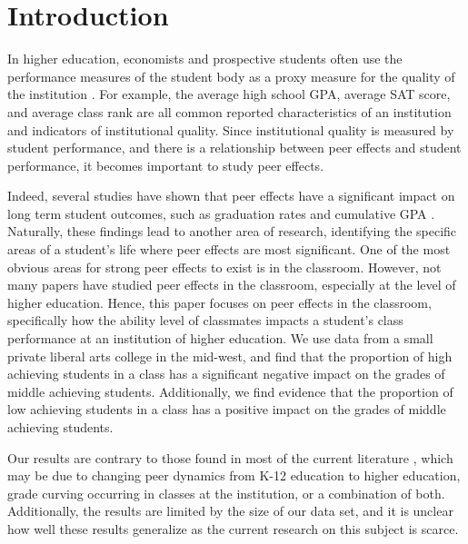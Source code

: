 \documentclass[12pt,letterpaper,english,fleqn]{article}
\date{March 2016}
\begin{document}

\doublespacing





\section{Introduction}\label{intro}

In higher education, economists and prospective students often use the performance measures of the student body as a proxy measure for the quality of the institution \citep{smith2015new,sarmiento2015quality,black2006estimating}.
For example, the average high school GPA, average SAT score, and average class rank are all common reported characteristics of an institution and indicators of institutional quality.
Since institutional quality is measured by student performance, and there is a relationship between peer effects and student performance, it becomes important to study peer effects. 

Indeed, several studies have shown that peer effects have a significant impact on long term student outcomes, such as graduation rates and cumulative GPA \citep{smith2015new,luppino2015college,ost2010role}. 
Naturally, these findings lead to another area of research, identifying the specific areas of a student's life where peer effects are most significant. 
One of the most obvious areas for strong peer effects to exist is in the classroom.
However, not many papers have studied peer effects in the classroom, especially at the level of higher education. 
Hence, this paper focuses on peer effects in the classroom, specifically how the ability level of classmates impacts a student's class performance at an institution of higher education.
We use data from a small private liberal arts college in the mid-west, and find that the proportion of high achieving students in a class has a significant negative impact on the grades of middle achieving students. 
Additionally, we find evidence that the proportion of low achieving students in a class has a positive impact on the grades of middle achieving students. 

Our results are contrary to those found in most of the current literature \citep{kang2007classroom,carman2012classroom,burke2013classroom,schlosser2008inside,lavy2012good}, which may be due to changing peer dynamics from K-12 education to higher education, grade curving occurring in classes at the institution, or a combination of both.
Additionally, the results are limited by the size of our data set, and it is unclear how well these results generalize as the current research on this subject is scarce.
\end{document}
